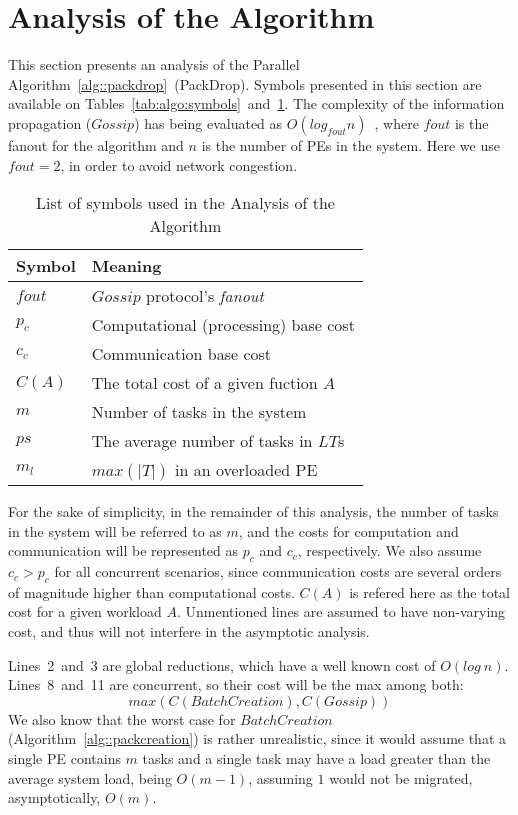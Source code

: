 \section{Analysis of the Algorithm} \label{sec:analysis}

This section presents an analysis of the Parallel Algorithm~\ref{alg::packdrop}~(PackDrop). 
Symbols presented in this section are available on Tables~\ref{tab:algo:symbols}~and~\ref{tab:analysis:symbols}.
The complexity of the information propagation ($Gossip$) has being evaluated as $O(log_{fout}n)$~\cite{grapevine},
where $fout$ is the fanout for the algorithm and $n$ is the number of PEs in the system.
Here we use $fout=2$, in order to avoid network congestion. 

\begin{table}[!ht]
	\caption{List of symbols used in the Analysis of the Algorithm}
	\centering	
	\begin{tabular}{l |l}
		Symbol			& Meaning\\		\hline
		$fout$			& $Gossip$ protocol's \textit{fanout}						 \\ 
		$p_c$			& Computational (processing) base cost				 \\
		$c_c$			& Communication base cost							 \\
		$C(A)$			& The total cost of a given fuction $A$				 \\
		$m$				& Number of tasks in the system						 \\
		$ps$				& The average number of tasks in $LT$s				 \\
		$m_l$			& $max(|T|)$ in an overloaded PE						 \\
	\end{tabular}
	\label{tab:analysis:symbols}
\end{table}

For the sake of simplicity, in the remainder of this analysis, the number of tasks in the system
will be referred to as $m$, and the costs for computation and communication will be represented as $p_c$ and $c_c$, respectively.
We also assume $c_c > p_c$ for all concurrent scenarios, since communication costs are several orders of magnitude higher than computational costs.
$C(A)$ is refered here as the total cost for a given workload $A$.
Unmentioned lines are assumed to have non-varying cost, and thus will not interfere in the asymptotic analysis.

Lines~2~and~3 are global reductions, which have a well known cost of $O(log\ n)$.
Lines~8~and~11 are concurrent, so their cost will be the max among both:
\begin{equation}
  max(C(BatchCreation),C(Gossip))
\end{equation}
We also know that the worst case for $BatchCreation$ (Algorithm~\ref{alg::packcreation}) is rather unrealistic, 
since it would assume that a single PE contains $m$ tasks and a single task may have a load greater than the average system load, being $O(m-1)$, assuming $1$ would not be migrated, asymptotically, $O(m)$.

